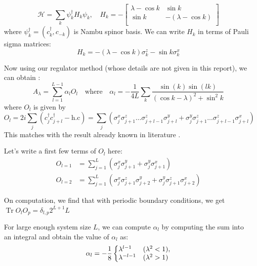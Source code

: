 \documentclass[11pt,a4paper]{article}
\DeclareMathOperator{\Tr}{Tr}
\begin{document}
\begin{equation}
\mathcal{H}= \sum_k \psi_k^{\dagger} H_k \psi_k , \quad H_k=-\begin{bmatrix}
     \lambda - \cos k & \sin k \\
\sin k & -(\lambda - \cos k)\\
\end{bmatrix}
\end{equation}
where $\psi_k^{\dagger}= (c^{\dagger}_k, c_{-k})$ is Nambu spinor basis. We can write $H_k$ in terms of Pauli sigma matrices:
\begin{equation}
H_k= -(\lambda - \cos k) \sigma^z_k - \sin k  \sigma^x_k
\end{equation}



Now using our regulator method (whose details are not given in this report), we can obtain :
\begin{equation}
\boxed{A_{\lambda}= \sum_{l=1}^{L-1} \alpha_l O_l \quad \mbox{where} \quad \alpha_l= -\dfrac{1}{4 L} \sum_k \dfrac{\sin(k) \sin(lk)}{(\cos k - \lambda)^2 + \sin^2 k}}
\end{equation}
where  $O_l$ is given by
\begin{equation}
O_l= 2 i \sum_j (c^{\dagger}_{j} c^{\dagger}_{j+l} - \mbox{h.c})= \sum_j ( \sigma_j^x \sigma_{j+1}^z \ldots \sigma_{j+l-1}^z \sigma_{j+l}^y +  \sigma_j^y \sigma_{j+1}^z \ldots \sigma_{j+l-1}^z \sigma_{j+l}^x)
\end{equation}
This matches with the result already known in literature \cite{del2012assisted, kolodrubetz2016geometry}.


Let's write a first few terms of $O_l$ here:
\begin{align*}
O_{l=1}&=  \sum_{j=1}^{L} ( \sigma_j^x  \sigma_{j+1}^y +  \sigma_j^y  \sigma_{j+1}^x) \\
O_{l=2} &=  \sum_{j=1}^{L} ( \sigma_j^x \sigma_{j+1}^z \sigma_{j+2}^y +  \sigma_j^y \sigma_{j+1}^z \sigma_{j+2}^x) 
\end{align*}

On computation, we find that with periodic boundary conditions, we get $\Tr O_l  O_p= \delta_{l,p} 2^{L+1} L$

For large enough system size $L$, we can compute $\alpha_l$ \cite{kolodrubetz2016geometry} by computing the sum into an integral and obtain the value of $\alpha_l$ as: 
\begin{equation}
 \alpha_l=-\dfrac{1}{8}\left\{
  \begin{array}{@{}ll@{}}
    \lambda^{l-1} & (\lambda^2 <1), \\
     \lambda^{-l-1} & (\lambda^2 >1)
  \end{array}\right.
\end{equation}
\end{document}

